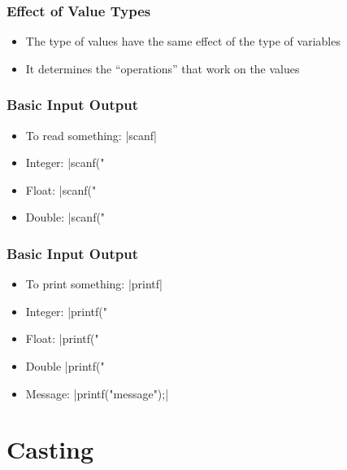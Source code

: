 \documentclass{../c-lecture}
\begin{document}
\begin{frame}
  \frametitle{Effect of Value Types}
  \begin{itemize}
    \item The type of values have the same effect of the type of variables
    \item It determines the “operations” that work on the values
  \end{itemize}
\end{frame}

\begin{frame}[fragile]
  \frametitle{Basic Input Output}
  \begin{itemize}
    \item To read something: |scanf|
    \item Integer: |scanf("%
    \item Float: |scanf("%
    \item Double: |scanf("%
  \end{itemize}
\end{frame}

\begin{frame}[fragile]
  \frametitle{Basic Input Output}
  \begin{itemize}
    \item To print something: |printf|
    \item Integer: |printf("%
    \item Float: |printf("%
    \item Double |printf("%
    \item Message: |printf("message");|
  \end{itemize}
\end{frame}

\section{Casting}
\end{document}
